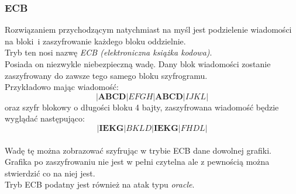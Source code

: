 \subsubsection{ECB}
Rozwiązaniem przychodzącym natychmiast na myśl jest podzielenie wiadomości na bloki~i zaszyfrowanie każdego bloku oddzielnie. \\
Tryb ten nosi nazwę \textit{ECB (elektroniczna książka kodowa)}. \\
Posiada on niezwykle niebezpieczną wadę. Dany blok wiadomości zostanie zaszyfrowany do zawsze tego samego bloku szyfrogramu. \\
Przykładowo mając wiadomość: $$|\textbf{ABCD}|EFGH|\textbf{ABCD}|IJKL|$$ oraz szyfr blokowy o długości bloku 4 bajty, zaszyfrowana wiadomość będzie wyglądać następująco: $$|\textbf{IEKG}|BKLD|\textbf{IEKG}|FHDL|$$\\
Wadę tę można zobrazować szyfrując w trybie ECB dane dowolnej grafiki. 
Grafika po zaszyfrowaniu nie jest w pełni czytelna ale z pewnością można stwierdzić co na niej jest. \\
Tryb ECB podatny jest również na atak typu \textit{oracle}. \\


